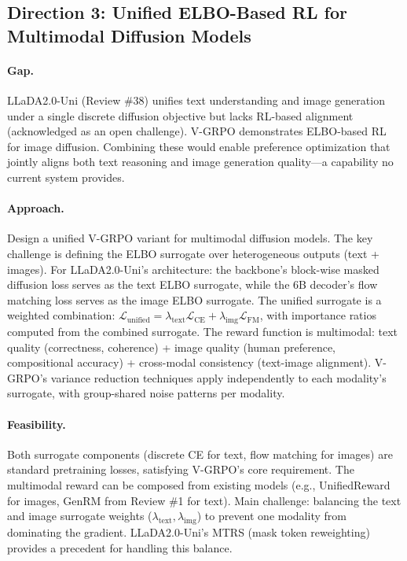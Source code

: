 \documentclass[11pt]{article}
\begin{document}
\subsection{Direction 3: Unified ELBO-Based RL for Multimodal Diffusion Models}

\paragraph{Gap.}
LLaDA2.0-Uni (Review \#38) unifies text understanding and image generation under a single discrete diffusion objective but lacks RL-based alignment (acknowledged as an open challenge). V-GRPO demonstrates ELBO-based RL for image diffusion. Combining these would enable preference optimization that jointly aligns both text reasoning and image generation quality---a capability no current system provides.

\paragraph{Approach.}
Design a unified V-GRPO variant for multimodal diffusion models. The key challenge is defining the ELBO surrogate over heterogeneous outputs (text + images). For LLaDA2.0-Uni's architecture: the backbone's block-wise masked diffusion loss serves as the text ELBO surrogate, while the 6B decoder's flow matching loss serves as the image ELBO surrogate. The unified surrogate is a weighted combination: $\mathcal{L}_{\mathrm{unified}} = \lambda_{\mathrm{text}} \mathcal{L}_{\mathrm{CE}} + \lambda_{\mathrm{img}} \mathcal{L}_{\mathrm{FM}}$, with importance ratios computed from the combined surrogate. The reward function is multimodal: text quality (correctness, coherence) + image quality (human preference, compositional accuracy) + cross-modal consistency (text-image alignment). V-GRPO's variance reduction techniques apply independently to each modality's surrogate, with group-shared noise patterns per modality.

\paragraph{Feasibility.}
Both surrogate components (discrete CE for text, flow matching for images) are standard pretraining losses, satisfying V-GRPO's core requirement. The multimodal reward can be composed from existing models (e.g., UnifiedReward for images, GenRM from Review \#1 for text). Main challenge: balancing the text and image surrogate weights ($\lambda_{\mathrm{text}}, \lambda_{\mathrm{img}}$) to prevent one modality from dominating the gradient. LLaDA2.0-Uni's MTRS (mask token reweighting) provides a precedent for handling this balance.
\end{document}
